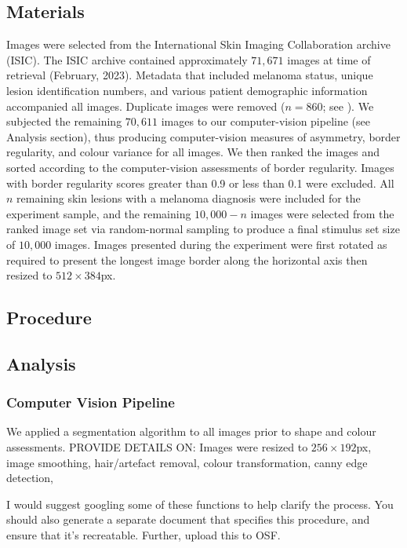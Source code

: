 \documentclass[a4paper, natbib, doc, 12pt]{apa7}
\begin{document}
\subsection{Materials}
Images were selected from the International Skin Imaging Collaboration archive (ISIC). The ISIC archive contained approximately $71, 671$ images at time of retrieval (February, 2023). Metadata that included melanoma status, unique lesion identification numbers, and various patient demographic information accompanied all images. Duplicate images were removed ($n = 860$; see \cite{cassidy2022analysis}). We subjected the remaining $70, 611$ images to our computer-vision pipeline (see Analysis section), thus producing computer-vision measures of asymmetry, border regularity, and colour variance for all images. We then ranked the images and sorted according to the computer-vision assessments of border regularity. Images with border regularity scores greater than 0.9 or less than 0.1 were excluded. All $n$ remaining skin lesions with a melanoma diagnosis were included for the experiment sample, and the remaining $10,000 - n$ images were selected from the ranked image set via random-normal sampling to produce a final stimulus set size of $10, 000$ images. Images presented during the experiment were first rotated as required to present the longest image border along the horizontal axis then resized to $512\times384$px. 

\subsection{Procedure}

\subsection{Analysis}
\subsubsection{Computer Vision Pipeline}%
We applied a segmentation algorithm to all images prior to shape and colour assessments. PROVIDE DETAILS ON: Images were resized to $256\times192$px, image smoothing, hair/artefact removal, colour transformation, canny edge detection, 

I would suggest googling some of these functions to help clarify the process. You should also generate a separate document that specifies this procedure, and ensure that it's recreatable. Further, upload this to OSF.
\end{document}
